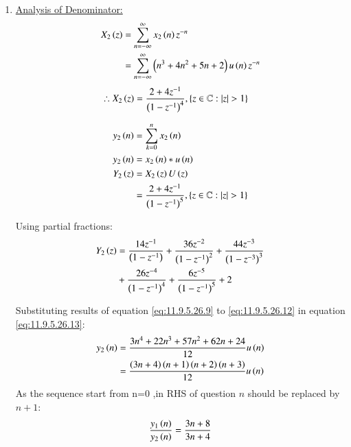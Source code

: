 \documentclass[journal,12pt,twocolumn]{IEEEtran}
\theoremstyle{remark}
\begin{document}
\begin{enumerate}[label=\arabic*.]
\item \underline{Analysis of Denominator:}
\begin{align}
    X_2\left(z\right) &= \sum_{n=-\infty}^\infty x_2\left(n\right) z^{-n}\\
                &= \sum_{n=-\infty}^\infty \left(n^{3}+4n^{2}+5n+2\right) u\left(n\right) z^{-n}
\end{align}
\begin{align}
   \therefore  X_2\left(z\right) &= \frac{2+4z^{-1}}{\left(1-z^{-1}\right)^4},\left\{z\in\mathbb{C} : \lvert z \rvert > 1\right\}   
\end{align}

\begin{align}
    y_2\left(n\right) &= \sum_{k=0}^n x_2\left(n\right)\\
    y_2\left(n\right) &= x_2\left(n\right)\ast u\left(n\right)\\
    Y_2\left(z\right) &= X_2\left(z\right) U\left(z\right) \\
 &=\frac{2+4z^{-1}}{\left(1-z^{-1}\right)^5} ,\left\{z\in\mathbb{C} : \lvert z \rvert > 1\right\} 
\end{align}

Using partial fractions:
\begin{align}
    Y_2\left(z\right) &= \frac{14z^{-1}}{\left(1-z^{-1}\right)} + \frac{36z^{-2}}{\left(1-z^{-1}\right)^2} + \frac{44z^{-3}}{\left(1-z^{-3}\right)^3} \label{eq:11.9.5.26.13}\\
    &+ \frac{26z^{-4}}{\left(1-z^{-1}\right)^4}+\frac{6z^{-5}}{\left(1-z^{-1}\right)^5}+2\notag 
\end{align}

Substituting results of equation \eqref{eq:11.9.5.26.9} to \eqref{eq:11.9.5.26.12} in equation \eqref{eq:11.9.5.26.13}:
\begin{align}
    y_2\left(n\right) &=  \frac{3n^4 + 22n^3 + 57n^2 + 62n + 24}{12}u\left(n\right)\\
                &= \frac{\left(3n+4\right)\left(n+1\right)\left(n+2\right)\left(n+3\right)}{12}u\left(n\right)
\end{align}
As the sequence start from n=0 ,in RHS of question $n$ should be replaced by $n+1$:
\begin{align}
    \frac{y_1\left(n\right)}{y_2\left(n\right)} = \frac{3n+8}{3n+4}
\end{align}

\end{enumerate}
\end{document}
